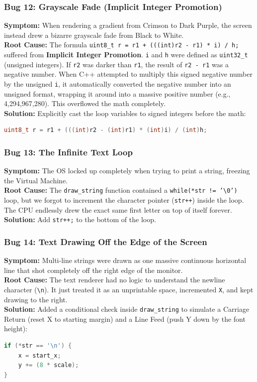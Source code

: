 \documentclass[12pt,a4paper]{report}
\begin{document}
\subsubsection*{Bug 12: Grayscale Fade (Implicit Integer Promotion)}
\textbf{Symptom:} When rendering a gradient from Crimson to Dark Purple, the screen instead drew a bizarre grayscale fade from Black to White.\\
\textbf{Root Cause:} The formula \texttt{uint8\_t r = r1 + (((int)r2 - r1) * i) / h;} suffered from \textbf{Implicit Integer Promotion}. \texttt{i} and \texttt{h} were defined as \texttt{uint32\_t} (unsigned integers). If \texttt{r2} was darker than \texttt{r1}, the result of \texttt{r2 - r1} was a negative number. When C++ attempted to multiply this signed negative number by the unsigned \texttt{i}, it automatically converted the negative number into an unsigned format, wrapping it around into a massive positive number (e.g., 4,294,967,280). This overflowed the math completely.\\
\textbf{Solution:} Explicitly cast the loop variables to signed integers before the math:
\begin{lstlisting}[language=C++]
uint8_t r = r1 + (((int)r2 - (int)r1) * (int)i) / (int)h;
\end{lstlisting}

\subsubsection*{Bug 13: The Infinite Text Loop}
\textbf{Symptom:} The OS locked up completely when trying to print a string, freezing the Virtual Machine.\\
\textbf{Root Cause:} The \texttt{draw\_string} function contained a \texttt{while(*str != '\textbackslash 0')} loop, but we forgot to increment the character pointer (\texttt{str++}) inside the loop. The CPU endlessly drew the exact same first letter on top of itself forever.\\
\textbf{Solution:} Add \texttt{str++;} to the bottom of the loop.

\subsubsection*{Bug 14: Text Drawing Off the Edge of the Screen}
\textbf{Symptom:} Multi-line strings were drawn as one massive continuous horizontal line that shot completely off the right edge of the monitor.\\
\textbf{Root Cause:} The text renderer had no logic to understand the newline character (\texttt{\textbackslash n}). It just treated it as an unprintable space, incremented \texttt{X}, and kept drawing to the right.\\
\textbf{Solution:} Added a conditional check inside \texttt{draw\_string} to simulate a Carriage Return (reset X to starting margin) and a Line Feed (push Y down by the font height):
\begin{lstlisting}[language=C++]
if (*str == '\n') {
    x = start_x;
    y += (8 * scale);
}
\end{lstlisting}
\end{document}
